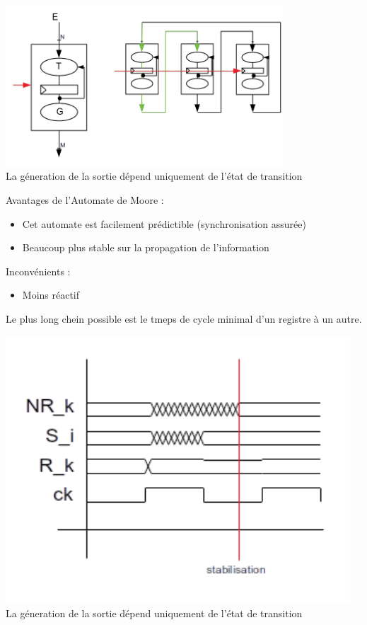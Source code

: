 \documentclass[10pt]{article}
\begin{document}
\begin{center}
  \includegraphics[height=6cm]{./pics/moore.png}
  \\ La géneration de la sortie dépend uniquement de l'état de transition
\end{center}
Avantages de l'Automate de Moore :
\begin{itemize}
  \item Cet automate est facilement prédictible (synchronisation assurée)
  \item Beaucoup plus stable sur la propagation de l'information
\end{itemize}
Inconvénients :
\begin{itemize}
  \item Moins réactif
\end{itemize}
Le plus long chein possible est le tmeps de cycle minimal d'un registre à un
autre.
\begin{center}
  \includegraphics[height=10cm]{./pics/chrono.png}
  \\ La géneration de la sortie dépend uniquement de l'état de transition
\end{center}
\end{document}
